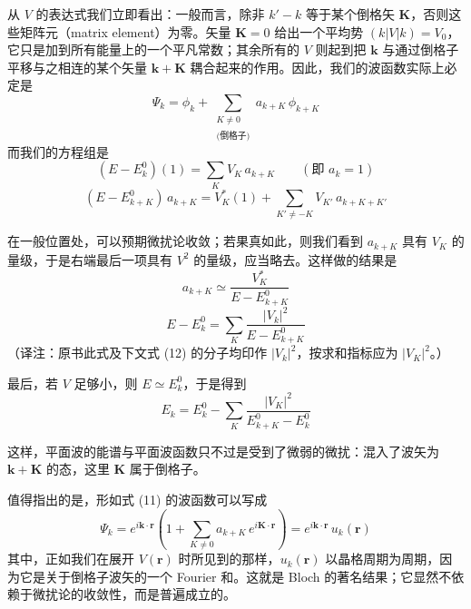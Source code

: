 从 $V$ 的表达式我们立即看出：一般而言，除非 $k' - k$ 等于某个倒格矢 $\mathbf{K}$，否则这些矩阵元（matrix element）为零。矢量 $\mathbf{K} = 0$ 给出一个平均势 $(k|V|k) = V_0$，它只是加到所有能量上的一个平凡常数；其余所有的 $V$ 则起到把 $\mathbf{k}$ 与通过倒格子平移与之相连的某个矢量 $\mathbf{k}+\mathbf{K}$ 耦合起来的作用。因此，我们的波函数实际上必定是
\begin{equation*}
\Psi_k = \phi_k + \sum_{\substack{K\neq 0 \\ \text{(倒格子)}}} a_{k+K}\,\phi_{k+K} \tag{11}
\end{equation*}
而我们的方程组是
\begin{equation*}
(E - E_k^{0})(1) = \sum_K V_K\,a_{k+K} \qquad (\text{即 } a_k = 1)
\end{equation*}
\begin{equation*}
(E - E_{k+K}^{0})\,a_{k+K} = V_K^{*}(1) + \sum_{K'\neq -K} V_{K'}\,a_{k+K+K'}
\end{equation*}

在一般位置处，可以预期微扰论收敛；若果真如此，则我们看到 $a_{k+K}$ 具有 $V_K$ 的量级，于是右端最后一项具有 $V^2$ 的量级，应当略去。这样做的结果是
\begin{equation*}
a_{k+K} \simeq \frac{V_K^{*}}{E - E_{k+K}^{0}}
\end{equation*}
\begin{equation*}
E - E_k^{0} = \sum_K \frac{|V_k|^{2}}{E - E_{k+K}^{0}}
\end{equation*}
（译注：原书此式及下文式 (12) 的分子均印作 $|V_k|^2$，按求和指标应为 $|V_K|^2$。）

最后，若 $V$ 足够小，则 $E \simeq E_k^{0}$，于是得到
\begin{equation*}
E_k = E_k^{0} - \sum_K \frac{|V_K|^{2}}{E_{k+K}^{0} - E_k^{0}} \tag{12}
\end{equation*}

这样，平面波的能谱与平面波函数只不过是受到了微弱的微扰：混入了波矢为 $\mathbf{k}+\mathbf{K}$ 的态，这里 $\mathbf{K}$ 属于倒格子。

值得指出的是，形如式 (11) 的波函数可以写成
\begin{equation*}
\Psi_k = e^{i\mathbf{k}\cdot\mathbf{r}}\left(1 + \sum_{K\neq 0} a_{k+K}\,e^{i\mathbf{K}\cdot\mathbf{r}}\right) = e^{i\mathbf{k}\cdot\mathbf{r}}\,u_k(\mathbf{r})
\end{equation*}
其中，正如我们在展开 $V(\mathbf{r})$ 时所见到的那样，$u_k(\mathbf{r})$ 以晶格周期为周期，因为它是关于倒格子波矢的一个 Fourier 和。这就是 Bloch 的著名结果；它显然不依赖于微扰论的收敛性，而是普遍成立的。

